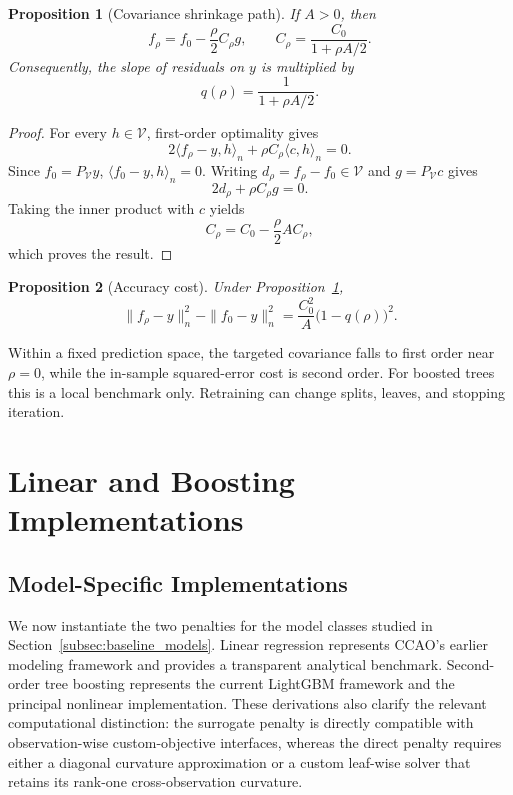 \documentclass[10pt]{article}
\newtheorem{proposition}{Proposition}
\theoremstyle{definition}
\newcommand{\1}{\mathbf{1}}
\newcommand{\Vcal}{\mathcal{V}}
\begin{document}
{{\begin{proposition}[Covariance shrinkage path]
\label{prop:path}
If $A>0$, then
\[
f_\rho=f_0-\frac{\rho}{2}C_\rho g,
\qquad
C_\rho=\frac{C_0}{1+\rho A/2}.
\]
Consequently, the slope of residuals on $y$ is multiplied by
\[
q(\rho)=\frac{1}{1+\rho A/2}.
\]
\end{proposition}

\begin{proof}
For every $h\in\Vcal$, first-order optimality gives
\[
2\langle f_\rho-y,h\rangle_n
+\rho C_\rho\langle c,h\rangle_n=0.
\]
Since $f_0=P_{\Vcal}y$, $\langle f_0-y,h\rangle_n=0$. Writing
$d_\rho=f_\rho-f_0\in\Vcal$ and $g=P_{\Vcal}c$ gives
\[
2d_\rho+\rho C_\rho g=0.
\]
Taking the inner product with $c$ yields
\[
C_\rho=C_0-\frac{\rho}{2}AC_\rho,
\]
which proves the result.
\end{proof}

\begin{proposition}[Accuracy cost]
\label{prop:path_cost}
Under Proposition~\ref{prop:path},
\[
\|f_\rho-y\|_n^2-\|f_0-y\|_n^2
=
\frac{C_0^2}{A}\bigl(1-q(\rho)\bigr)^2.
\]
\end{proposition}

Within a fixed prediction space, the targeted covariance falls to first order near $\rho=0$, while the in-sample squared-error cost is second order. For boosted trees this is a local benchmark only. Retraining can change splits, leaves, and stopping iteration.

\section{Linear and Boosting Implementations}
\label{app:implementation}


{
\color{red}

\subsection{Model-Specific Implementations}
\label{subsec:model_specific_implementations}

We now instantiate the two penalties for the model classes studied in Section~\ref{subsec:baseline_models}. Linear regression represents CCAO's earlier modeling framework and provides a transparent analytical benchmark. Second-order tree boosting represents the current LightGBM framework and the principal nonlinear implementation. These derivations also clarify the relevant computational distinction: the surrogate penalty is directly compatible with observation-wise custom-objective interfaces, whereas the direct penalty requires either a diagonal curvature approximation or a custom leaf-wise solver that retains its rank-one cross-observation curvature.

}}}
\end{document}

